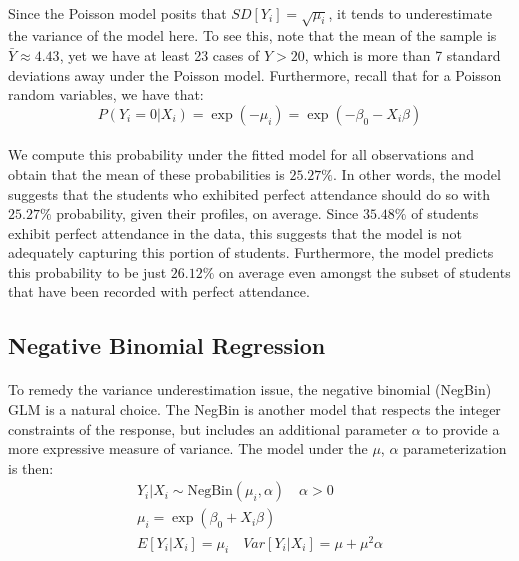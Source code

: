 \documentclass[12pt, titlepage]{article}
\begin{document}
	\paragraph{}Since the Poisson model posits that $SD[Y_i] = \sqrt{\mu_i}$, it tends to underestimate the variance of the model here. To see this, note that the mean of the sample is $\bar{Y} \approx 4.43$, yet we have at least 23 cases of $Y > 20$, which is more than 7 standard deviations away under the Poisson model. Furthermore, recall that for a Poisson random variables, we have that:
	$$
	P(Y_i = 0 | X_i) = \exp(-\mu_i) = \exp(-\beta_0 - X_i\beta)
	$$
	\paragraph{} We compute this probability under the fitted model for all observations and obtain that the mean of these probabilities is $25.27\%$. In other words, the model suggests that the students who exhibited perfect attendance should do so with $25.27\%$ probability, given their profiles, on average. Since $35.48\%$ of students exhibit perfect attendance in the data, this suggests that the model is not adequately capturing this portion of students. Furthermore, the model predicts this probability to be just $26.12\%$ on average even amongst the subset of students that have been recorded with perfect attendance.
	
	\subsection{Negative Binomial Regression}
	
	\paragraph{} To remedy the variance underestimation issue, the negative binomial (NegBin) GLM is a natural choice. The NegBin is another model that respects the integer constraints of the response, but includes an additional parameter $\alpha$ to provide a more expressive measure of variance. The model under the $\mu$, $\alpha$ parameterization is then:
	\begin{gather*}
	Y_i|X_i \sim \text{NegBin}(\mu_i, \alpha) \quad \alpha > 0\\ 
	\mu_i = \exp(\beta_0 + X_i\beta) \\
	E[Y_i|X_i] = \mu_i \quad Var[Y_i|X_i] = \mu + \mu^2\alpha
	\end{gather*}
\end{document}
